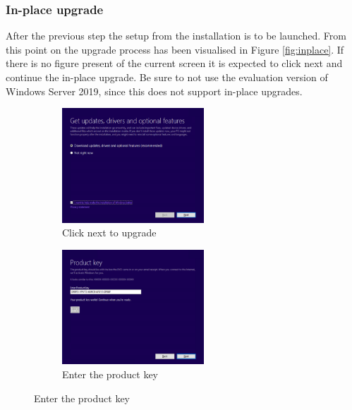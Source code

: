 \subsubsection{In-place upgrade}
After the previous step the setup from the installation is to be launched. From this point on the upgrade process has been visualised in Figure \ref{fig:inplace}. If there is no figure present of the current screen it is expected to click next and continue the in-place upgrade. Be sure to not use the evaluation version of Windows Server 2019, since this does not support in-place upgrades.
\begin{figure}[h]
	\begin{subfigure}{0.5\textwidth}
		\includegraphics[width=0.9\linewidth,height=4.3cm]{img/In-Place_WS_2.png}
		\captionsetup{width=0.8\linewidth}
		\centering		
		\caption{Click next to upgrade}
		\label{fig:inplace2}
	\end{subfigure}
	\begin{subfigure}{0.5\textwidth}
		\captionsetup{width=0.8\linewidth}
		\includegraphics[width=0.9\linewidth,height=4.3cm]{img/In-Place_WS_3.png}
		\centering
		\caption{Enter the product key}
		\label{fig:inplace3}
	\end{subfigure}
\end{figure}
